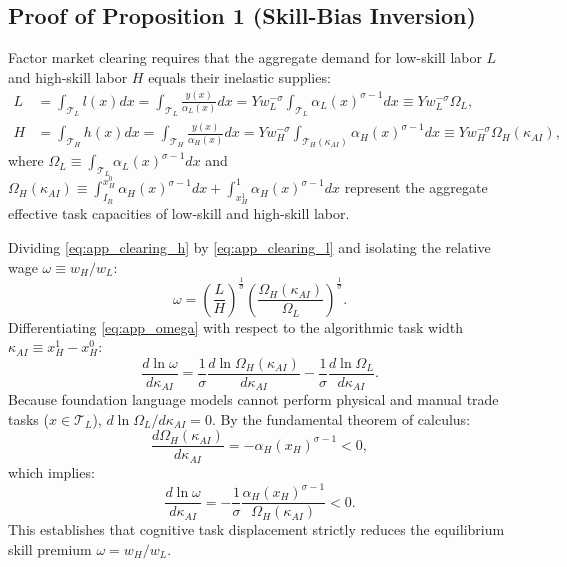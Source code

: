 \documentclass[12pt]{article}
\begin{document}
\subsection{Proof of Proposition 1 (Skill-Bias Inversion)}

Factor market clearing requires that the aggregate demand for low-skill labor $L$ and high-skill labor $H$ equals their inelastic supplies:
\begin{align}
L &= \int_{\mathcal{T}_L} l(x) dx = \int_{\mathcal{T}_L} \frac{y(x)}{\alpha_L(x)} dx = Y w_L^{-\sigma} \int_{\mathcal{T}_L} \alpha_L(x)^{\sigma - 1} dx \equiv Y w_L^{-\sigma} \Omega_L, \label{eq:app_clearing_l} \\
H &= \int_{\mathcal{T}_H} h(x) dx = \int_{\mathcal{T}_H} \frac{y(x)}{\alpha_H(x)} dx = Y w_H^{-\sigma} \int_{\mathcal{T}_H(\kappa_{AI})} \alpha_H(x)^{\sigma - 1} dx \equiv Y w_H^{-\sigma} \Omega_H(\kappa_{AI}), \label{eq:app_clearing_h}
\end{align}
where $\Omega_L \equiv \int_{\mathcal{T}_L} \alpha_L(x)^{\sigma - 1} dx$ and $\Omega_H(\kappa_{AI}) \equiv \int_{I_R}^{x_H^0} \alpha_H(x)^{\sigma - 1} dx + \int_{x_H^1}^1 \alpha_H(x)^{\sigma - 1} dx$ represent the aggregate effective task capacities of low-skill and high-skill labor.

Dividing \eqref{eq:app_clearing_h} by \eqref{eq:app_clearing_l} and isolating the relative wage $\omega \equiv w_H / w_L$:
\begin{equation}
\label{eq:app_omega}
\omega = \left( \frac{L}{H} \right)^{\frac{1}{\sigma}} \left( \frac{\Omega_H(\kappa_{AI})}{\Omega_L} \right)^{\frac{1}{\sigma}}.
\end{equation}
Differentiating \eqref{eq:app_omega} with respect to the algorithmic task width $\kappa_{AI} \equiv x_H^1 - x_H^0$:
\begin{equation}
\frac{d \ln \omega}{d \kappa_{AI}} = \frac{1}{\sigma} \frac{d \ln \Omega_H(\kappa_{AI})}{d \kappa_{AI}} - \frac{1}{\sigma} \frac{d \ln \Omega_L}{d \kappa_{AI}}.
\end{equation}
Because foundation language models cannot perform physical and manual trade tasks ($x \in \mathcal{T}_L$), $d \ln \Omega_L / d \kappa_{AI} = 0$. By the fundamental theorem of calculus:
\begin{equation}
\frac{d \Omega_H(\kappa_{AI})}{d \kappa_{AI}} = -\alpha_H(x_H)^{\sigma - 1} < 0,
\end{equation}
which implies:
\begin{equation}
\frac{d \ln \omega}{d \kappa_{AI}} = -\frac{1}{\sigma} \frac{\alpha_H(x_H)^{\sigma - 1}}{\Omega_H(\kappa_{AI})} < 0.
\end{equation}
This establishes that cognitive task displacement strictly reduces the equilibrium skill premium $\omega = w_H / w_L$.
\end{document}

